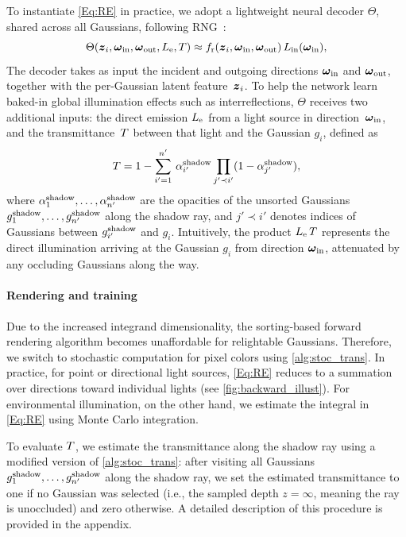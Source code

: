 

To instantiate \autoref{Eq:RE} in practice, we adopt a lightweight neural decoder $\Theta$, shared across all Gaussians, following RNG~\cite{RNG}:
%
\begin{equation}
	\label{Eq:neural_appearance}
	\Theta(\boldsymbol{z}_i, \boldsymbol{\omega}_\mathrm{in}, \boldsymbol{\omega}_\mathrm{out}, L_\mathrm{e}, T) \approx f_\mathrm{r}(\boldsymbol{z}_i, \boldsymbol{\omega}_\mathrm{in}, \boldsymbol{\omega}_\mathrm{out}) \,L_\mathrm{in}(\boldsymbol{\omega}_\mathrm{in}),
\end{equation}
%
The decoder takes as input the incident and outgoing directions $\boldsymbol{\omega}_\mathrm{in}$ and $\boldsymbol{\omega}_\mathrm{out}$, together with the per-Gaussian latent feature~$\boldsymbol{z}_i$.
To help the network learn baked-in global illumination effects such as interreflections, $\Theta$ receives two additional inputs: the direct emission $L_\mathrm{e}$ from a light source in direction~$\boldsymbol{\omega}_\mathrm{in}$, and the transmittance~$T$ between that light and the Gaussian $g_i$, defined as
%
\begin{equation}
	\label{Eq:T}
	T = 1 - \sum_{i' = 1}^{n'} \,\alpha^\mathrm{shadow}_{i'} \prod_{j' \prec i'} (1 - \alpha^\mathrm{shadow}_{j'}),
\end{equation}
%
where $\alpha^\mathrm{shadow}_1, \ldots, \alpha^\mathrm{shadow}_{n'}$ are the opacities of the unsorted Gaussians $g^\mathrm{shadow}_1, \ldots, g^\mathrm{shadow}_{n'}$ along the shadow ray, and $j' \prec i'$ denotes indices of Gaussians between $g^\mathrm{shadow}_{i'}$ and $g_i$.
Intuitively, the product $L_\mathrm{e} \,T$ represents the direct illumination arriving at the Gaussian $g_i$ from direction $\boldsymbol{\omega}_\mathrm{in}$, attenuated by any occluding Gaussians along the way.

\paragraph{Rendering and training}
Due to the increased integrand dimensionality, the sorting-based forward rendering algorithm becomes unaffordable for relightable Gaussians. Therefore, we switch to stochastic computation for pixel colors using \autoref{alg:stoc_trans}.
In practice, for point or directional light sources, \autoref{Eq:RE} reduces to a summation over directions toward individual lights (see \autoref{fig:backward_illust}).
For environmental illumination, on the other hand, we estimate the integral in \autoref{Eq:RE} using Monte Carlo integration.

To evaluate $T$, we estimate the transmittance along the shadow ray using a modified version of \autoref{alg:stoc_trans}: after visiting all Gaussians $g^\mathrm{shadow}_1, \ldots, g^\mathrm{shadow}_{n'}$ along the shadow ray, we set the estimated transmittance to one if no Gaussian was selected (i.e., the sampled depth $z = \infty$, meaning the ray is unoccluded) and zero otherwise.
A detailed description of this procedure is provided in the appendix.

